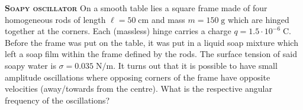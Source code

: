 \begin{problem}
{\textbf{\textsc{Soapy oscillator}}} On a smooth table lies a square frame made of four homogeneous rods of length $\ell=50\;\mathrm{cm}$ and mass $m=150\;\mathrm{g}$ which are hinged together at the corners. Each (massless) hinge carries a charge $q=1.5\cdot10^{-6}\;\mathrm{C}$. Before the frame was put on the table, it was put in a liquid soap mixture which left a soap film within the frame defined by the rods. The surface tension of said soapy water is $\sigma=0.035\;\mathrm{N/m}$. It turns out that it is possible to have small amplitude oscillations where opposing corners of the frame have opposite velocities (away/towards from the centre). What is the respective angular frequency of the oscillations?
\end{problem}